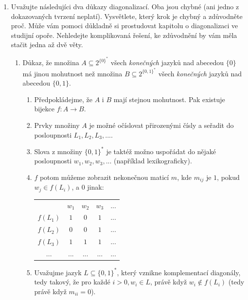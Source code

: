 \documentclass[a4paper,11pt]{article}[24.3.2010]
\begin{document}
\begin{enumerate}
\item Uvažujte následujíci dva důkazy diagonalizací. Oba jsou chybné (ani jedno z dokazovaných tvrzení neplatí). Vysvětlete, který krok je chybný a zdůvodněte proč. Může vám pomoci důkladně si prostudovat kapitolu o diagonalizaci ve studijní opoře. Nehledejte komplikovaná řešení, ke zdůvodnění by vám měla stačit jedna až dvě věty.
\renewcommand{\theenumi}{\alph{enumi}}
\begin{enumerate}
\item Důkaz, že množina $A \subseteq 2^{\{0\}^*}$ všech \emph{konečných} jazyků nad abecedou $\{0\}$ má jinou mohutnost než množina $B \subseteq 2^{\{0,1\}^*}$ všech \emph{konečných} jazyků nad abecedou $\{0,1\}$.
\begin{enumerate}
\item Předpokládejme, že $A$ i $B$ mají stejnou mohutnost. Pak existuje bijekce $f : A \rightarrow B$.
\item Prvky množiny $A$ je možné očíslovat přirozenými čísly a seřadit do posloupnosti $L_{1},L_{2},L_{3},...$.
\item Slova z množiny $\{0,1\}^*$ je taktéž možno uspořádat do nějaké posloupnosti $w_{1},w_{2},w_{3},...$ (například lexikograficky).
\item $f$ potom můžeme zobrazit nekonečnou maticí $m$, kde $m_{ij}$ je $1$, pokud $w_{j} \in f(L_{i})$, a $0$ jinak:
\begin{table}[ht]
\begin{center}
\begin{tabular}{ c  c  c  c  c } 
& $w_{1}$ & $w_{2}$ & $w_{3}$ & $...$ \\ 
$f(L_{1})$ & $1$ & $0$ & $1$ & $...$ \\ 
$f(L_{2})$ & $0$ & $0$ & $1$ & $...$ \\ 
$f(L_{3})$ & $1$ & $1$ & $1$ & $...$ \\ 
$...$ & $...$ & $...$ & $...$ & $...$ \\
\end{tabular}
\end{center}
\end{table}
\item Uvažujme jazyk $L \subseteq \{0,1\}^*$, který vznikne komplementací diagonály, tedy takový, že pro každé $i>0,w_{i} \in L$, právě když $w_{i} \notin f(L_{i})$ (tedy právě když $m_{ii}=0$).

\end{enumerate}
\end{enumerate}
\end{enumerate}
\end{document}

